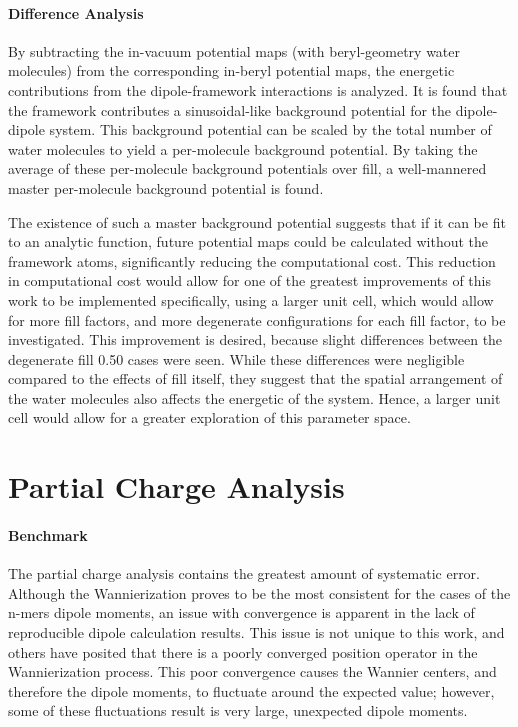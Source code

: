 \paragraph{Difference Analysis} By subtracting the in-vacuum potential maps (with beryl-geometry water molecules) from the corresponding in-beryl potential maps, the energetic contributions from the dipole-framework interactions is analyzed. It is found that the framework contributes a sinusoidal-like background potential for the dipole-dipole system. This background potential can be scaled by the total number of water molecules to yield a per-molecule background potential. By taking the average of these per-molecule background potentials over fill, a well-mannered master per-molecule background potential is found. 

The existence of such a master background potential suggests that if it can be fit to an analytic function, future potential maps could be calculated without the framework atoms, significantly reducing the computational cost. This reduction in computational cost would allow for one of the greatest improvements of this work to be implemented \textemdash specifically, using a larger unit cell, which would allow for more fill factors, and more degenerate configurations for each fill factor, to be investigated. This improvement is desired, because slight differences between the degenerate fill 0.50 cases were seen. While these differences were negligible compared to the effects of fill itself, they suggest that the spatial arrangement of the water molecules also affects the energetic of the system. Hence, a larger unit cell would allow for a greater exploration of this parameter space.

\section{Partial Charge Analysis}

\paragraph{Benchmark} The partial charge analysis contains the greatest amount of systematic error. Although the Wannierization proves to be the most consistent for the cases of the n-mers dipole moments, an issue with convergence is apparent in the lack of reproducible dipole calculation results. This issue is not unique to this work, and others have posited that there is a poorly converged position operator in the Wannierization process. This poor convergence causes the Wannier centers, and therefore the dipole moments, to fluctuate around the expected value; however, some of these fluctuations result is very large, unexpected dipole moments. 

